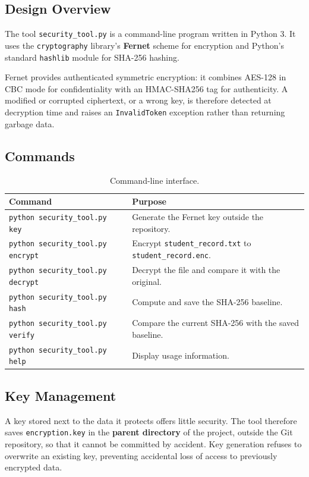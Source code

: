 \documentclass[11pt,a4paper]{article}
\begin{document}
\subsection{Design Overview}
The tool \texttt{security\_tool.py} is a command-line program written in Python 3.
It uses the \texttt{cryptography} library's \textbf{Fernet} scheme for encryption
and Python's standard \texttt{hashlib} module for SHA-256 hashing.

Fernet provides authenticated symmetric encryption: it combines AES-128 in CBC mode
for confidentiality with an HMAC-SHA256 tag for authenticity. A modified or
corrupted ciphertext, or a wrong key, is therefore detected at decryption time and
raises an \texttt{InvalidToken} exception rather than returning garbage data.

\subsection{Commands}
\begin{table}[h!]
\centering
\renewcommand{\arraystretch}{1.3}
\begin{tabular}{@{}l p{10.5cm}@{}}
\toprule
\textbf{Command} & \textbf{Purpose} \\
\midrule
\texttt{python security\_tool.py key}     & Generate the Fernet key outside the repository. \\
\texttt{python security\_tool.py encrypt} & Encrypt \texttt{student\_record.txt} to \texttt{student\_record.enc}. \\
\texttt{python security\_tool.py decrypt} & Decrypt the file and compare it with the original. \\
\texttt{python security\_tool.py hash}    & Compute and save the SHA-256 baseline. \\
\texttt{python security\_tool.py verify}  & Compare the current SHA-256 with the saved baseline. \\
\texttt{python security\_tool.py help}    & Display usage information. \\
\bottomrule
\end{tabular}
\caption{Command-line interface.}
\end{table}

\subsection{Key Management}
A key stored next to the data it protects offers little security. The tool
therefore saves \texttt{encryption.key} in the \textbf{parent directory} of the
project, outside the Git repository, so that it cannot be committed by accident.
Key generation refuses to overwrite an existing key, preventing accidental loss of
access to previously encrypted data.
\end{document}
